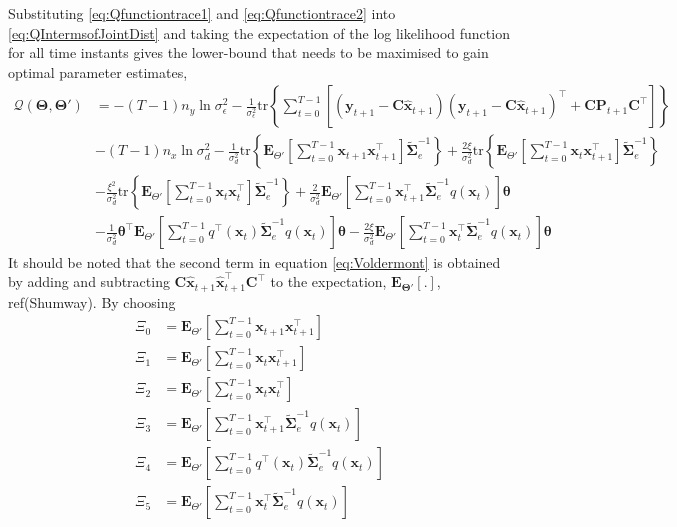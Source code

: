 \documentclass[]{article}
\begin{document}
Substituting  \ref{eq:Qfunctiontrace1} and \ref{eq:Qfunctiontrace2} into \ref{eq:QIntermsofJointDist} and taking the expectation of the log likelihood function for all time instants gives the lower-bound that needs to be maximised to gain optimal parameter estimates,
\begin{align}\label{eq:Voldermont}
 \mathcal Q(\boldsymbol \Theta,\boldsymbol\Theta')&= -(T-1)n_y\ln \sigma_{\epsilon}^2-\frac{1}{\sigma_{\epsilon}^2}\mathrm{tr}\left\lbrace\boldsymbol\sum_{t=0}^{T-1}\left[ (\mathbf y_{t+1}-\mathbf C\mathbf{\hat{x}}_{t+1}) (\mathbf y_{t+1}-\mathbf C\mathbf{\hat{x}}_{t+1})^\top+\mathbf C \mathbf P_{t+1}\mathbf C^\top\right] \right\rbrace\nonumber \\
&-(T-1)n_x\ln\sigma_d^2-\frac{1}{\sigma_d^2}\mathrm{tr}\left\lbrace \mathbf E_{\Theta'}\left[\sum_{t=0}^{T-1}\mathbf x_{t+1}\mathbf x_{t+1}^\top\right]\tilde{\boldsymbol\Sigma}_e^{-1}\right\rbrace +\frac{2\xi}{\sigma_d^2} \mathrm{tr}\left\lbrace \mathbf E_{\Theta'}\left[\sum_{t=0}^{T-1}\mathbf x_t\mathbf x_{t+1}^\top\right] \tilde{\boldsymbol\Sigma}_e^{-1}\right\rbrace \nonumber \\
&-\frac{\xi^2}{\sigma_d^2}\mathrm{tr} \left\lbrace\mathbf E_{\Theta'}\left[\sum_{t=0}^{T-1}\mathbf x_t\mathbf x_{t}^\top\right]\tilde{\boldsymbol\Sigma}_e^{-1} \right\rbrace +\frac{2}{\sigma_d^2}\mathbf E_{\Theta'}\left[\sum_{t=0}^{T-1}\mathbf x_{t+1}^\top\tilde{\boldsymbol\Sigma}_e^{-1}q( \mathbf x_t)\right]\boldsymbol\theta
 \nonumber \\
&-\frac{1}{\sigma_d^2}\boldsymbol\theta^\top \mathbf E_{\Theta'}\left[\sum_{t=0}^{T-1}  q^\top(\mathbf  x_t)\tilde{\boldsymbol\Sigma}_e^{-1}q(\mathbf x_t)\right]\boldsymbol\theta-\frac{2\xi}{\sigma_d^2} \mathbf E_{\Theta'}\left[\sum_{t=0}^{T-1} \mathbf x_t^\top\tilde{\boldsymbol\Sigma}_e^{-1}q(\mathbf x_t)  \right] \boldsymbol\theta
\end{align}
It should be noted that the second term in equation \ref{eq:Voldermont} is obtained by adding and subtracting $\mathbf C \mathbf{\hat{x}}_{t+1} \mathbf{\hat{x}}_{t+1}^\top \mathbf C^\top$ to the expectation, $\mathbf E_{\boldsymbol\Theta'}\left[ .\right]$, ref(Shumway). By choosing
\begin{align}
	\Xi_{0}&=\mathbf E_{\Theta'}\left[\sum_{t=0}^{T-1}\mathbf x_{t+1}\mathbf x_{t+1}^\top\right]\label{eq:defofXi0} \\
\Xi_{1}&=\mathbf E_{\Theta'}\left[\sum_{t=0}^{T-1}\mathbf x_t\mathbf x_{t+1}^\top\right]\label{eq:defofXi1} \\
\Xi_{2}&=\mathbf E_{\Theta'}\left[\sum_{t=0}^{T-1}\mathbf x_t\mathbf x_{t}^\top\right]\\
\Xi_{3}&=\mathbf E_{\Theta'}\left[\sum_{t=0}^{T-1}\mathbf x_{t+1}^\top\tilde{\boldsymbol\Sigma}_e^{-1}q( \mathbf x_t)\right] \label{eq:Xi3} \\	
\Xi_{4}&= \mathbf E_{\Theta'}\left[\sum_{t=0}^{T-1}  q^\top(\mathbf  x_t)\tilde{\boldsymbol\Sigma}_e^{-1}q(\mathbf x_t)\right] \label{eq:Xi4}\\
 \Xi_{5}&=\mathbf E_{\Theta'}\left[\sum_{t=0}^{T-1} \mathbf x_t^\top\tilde{\boldsymbol\Sigma}_e^{-1}q(\mathbf x_t)  \right] \label{eq:Xi5}
 \end{align}
\end{document}
